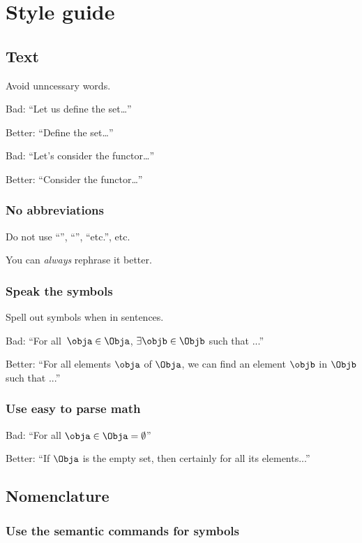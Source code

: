 \section{Style guide}
\subsection*{Text}


Avoid unncessary words.

Bad: ``Let us define the set\dots''

Better: ``Define the set\dots''

Bad: ``Let's consider the functor\dots''

Better: ``Consider the functor\dots ''


\subsubsection*{No abbreviations}
Do not use ``\ie '', ``\eg '', ``etc.'', etc.

You can \emph{always} rephrase it better.

\subsubsection*{Speak the symbols}
Spell out symbols when in sentences.

Bad: ``For all~$\obja\in \Obja$, $\exists \objb \in \Objb$ such that ...''

Better: ``For all elements $\obja$ of $\Obja$, we can find an element $\objb$ in $\Objb$ such that ...''

\subsubsection*{Use easy to parse math}

Bad: ``For all $\obja\in \Obja=\emptyset$''

Better: ``If $\Obja$ is the empty set, then certainly for all its elements...''

\subsection*{Nomenclature}

\subsubsection*{Use the semantic commands for symbols}

